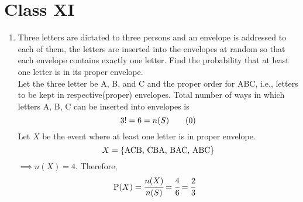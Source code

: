 \documentclass[journal,12pt,twocolumn]{IEEEtran}
\renewcommand\thesection{\arabic{section}}
\begin{document}
\section*{Class XI}
\begin{enumerate}[label=16.\arabic{enumi}.\arabic{enumii}]%
\setcounter{enumi}{3}
\setcounter{enumii}{6}
\item Three letters are dictated to three persons and an envelope is addressed to each of them, the letters are inserted into the envelopes at random so that each envelope contains exactly one letter. Find the probability that at least one letter is in its proper envelope.\\
	\solution 
	Let the three letter be A, B, and C and the proper order for ABC, i.e., letters to be kept in respective(proper) envelopes. Total number of ways in which letters A, B, C can be inserted into envelopes is \[3!=6=n(S) \numberthis \] Let $X$ be the event where at least one letter is in proper envelope. \[X = \left\{\text{ACB, CBA, BAC, ABC}\right\}\] $\implies n(X)=4.$ Therefore, 
  \begin{align}
	  \text{P}(X) &= \cfrac{n(X)}{n(S)}= \cfrac{4}{6} = \cfrac{2}{3} 
  \end{align}
\end{enumerate}
\end{document}
